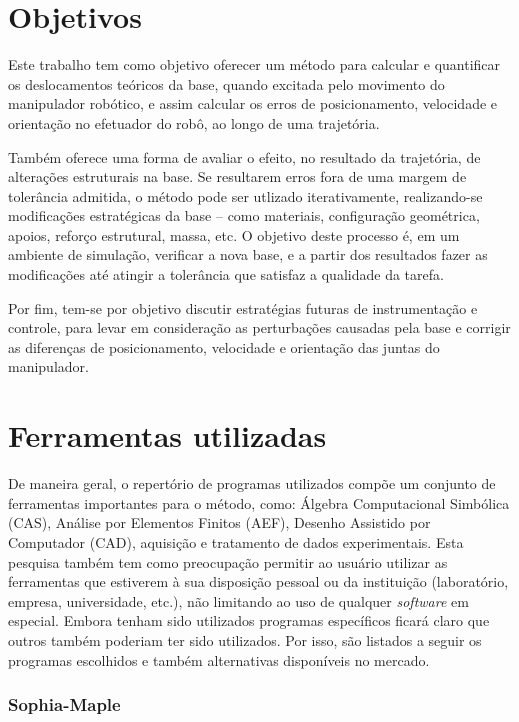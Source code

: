 \section{Objetivos}

Este trabalho tem como objetivo oferecer um método para calcular e quantificar
os deslocamentos teóricos da base, quando excitada pelo movimento do manipulador
robótico, e assim calcular os erros de posicionamento, velocidade e orientação
no efetuador do robô, ao longo de uma trajetória. 

Também oferece uma forma de avaliar o efeito, no resultado da trajetória, de
alterações estruturais na base. Se resultarem erros fora de uma margem de
tolerância admitida, o método pode ser utlizado iterativamente, realizando-se
modificações estratégicas da base -- como materiais, configuração geométrica,
apoios, reforço estrutural, massa, etc.
O objetivo deste processo é, em um ambiente de simulação, verificar a nova base,
e a partir dos resultados fazer as modificações até atingir a tolerância que
satisfaz a qualidade da tarefa.

Por fim, tem-se por objetivo discutir estratégias futuras de instrumentação e
controle, para levar em consideração as perturbações causadas pela base e
corrigir as diferenças de posicionamento, velocidade e orientação das juntas do
manipulador.


\section{Ferramentas utilizadas}

De maneira geral, o repertório de programas utilizados compõe um conjunto de
ferramentas importantes para o método, como: Álgebra Computacional Simbólica
(CAS), Análise por Elementos Finitos (AEF), Desenho Assistido por Computador
(CAD), aquisição e tratamento de dados experimentais. Esta pesquisa também tem
como preocupação permitir ao usuário utilizar as ferramentas que estiverem à sua
disposição pessoal ou da instituição (laboratório, empresa, universidade, etc.),
não limitando ao uso de qualquer \textit{software} em especial. Embora tenham
sido utilizados programas específicos ficará claro que outros também poderiam
ter sido utilizados. Por isso, são listados a seguir os programas escolhidos e
também alternativas disponíveis no mercado.

\subsubsection{Sophia-Maple}

